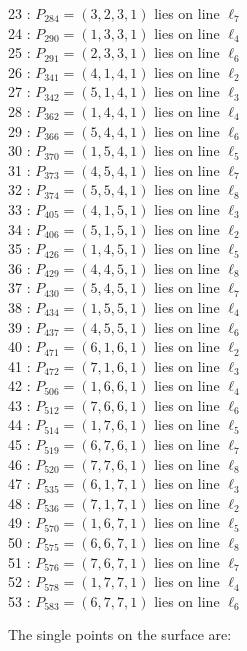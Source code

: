 \documentclass{article}
\begin{document}
{\begin{multicols}{2}
23 : $P_{284}=( 3, 2, 3, 1 )$ lies on line $\ell_{7}$\\
24 : $P_{290}=( 1, 3, 3, 1 )$ lies on line $\ell_{4}$\\
25 : $P_{291}=( 2, 3, 3, 1 )$ lies on line $\ell_{6}$\\
26 : $P_{341}=( 4, 1, 4, 1 )$ lies on line $\ell_{2}$\\
27 : $P_{342}=( 5, 1, 4, 1 )$ lies on line $\ell_{3}$\\
28 : $P_{362}=( 1, 4, 4, 1 )$ lies on line $\ell_{4}$\\
29 : $P_{366}=( 5, 4, 4, 1 )$ lies on line $\ell_{6}$\\
30 : $P_{370}=( 1, 5, 4, 1 )$ lies on line $\ell_{5}$\\
31 : $P_{373}=( 4, 5, 4, 1 )$ lies on line $\ell_{7}$\\
32 : $P_{374}=( 5, 5, 4, 1 )$ lies on line $\ell_{8}$\\
33 : $P_{405}=( 4, 1, 5, 1 )$ lies on line $\ell_{3}$\\
34 : $P_{406}=( 5, 1, 5, 1 )$ lies on line $\ell_{2}$\\
35 : $P_{426}=( 1, 4, 5, 1 )$ lies on line $\ell_{5}$\\
36 : $P_{429}=( 4, 4, 5, 1 )$ lies on line $\ell_{8}$\\
37 : $P_{430}=( 5, 4, 5, 1 )$ lies on line $\ell_{7}$\\
38 : $P_{434}=( 1, 5, 5, 1 )$ lies on line $\ell_{4}$\\
39 : $P_{437}=( 4, 5, 5, 1 )$ lies on line $\ell_{6}$\\
40 : $P_{471}=( 6, 1, 6, 1 )$ lies on line $\ell_{2}$\\
41 : $P_{472}=( 7, 1, 6, 1 )$ lies on line $\ell_{3}$\\
42 : $P_{506}=( 1, 6, 6, 1 )$ lies on line $\ell_{4}$\\
43 : $P_{512}=( 7, 6, 6, 1 )$ lies on line $\ell_{6}$\\
44 : $P_{514}=( 1, 7, 6, 1 )$ lies on line $\ell_{5}$\\
45 : $P_{519}=( 6, 7, 6, 1 )$ lies on line $\ell_{7}$\\
46 : $P_{520}=( 7, 7, 6, 1 )$ lies on line $\ell_{8}$\\
47 : $P_{535}=( 6, 1, 7, 1 )$ lies on line $\ell_{3}$\\
48 : $P_{536}=( 7, 1, 7, 1 )$ lies on line $\ell_{2}$\\
49 : $P_{570}=( 1, 6, 7, 1 )$ lies on line $\ell_{5}$\\
50 : $P_{575}=( 6, 6, 7, 1 )$ lies on line $\ell_{8}$\\
51 : $P_{576}=( 7, 6, 7, 1 )$ lies on line $\ell_{7}$\\
52 : $P_{578}=( 1, 7, 7, 1 )$ lies on line $\ell_{4}$\\
53 : $P_{583}=( 6, 7, 7, 1 )$ lies on line $\ell_{6}$\\
\end{multicols}
The single points on the surface are:\\
}
\end{document}
